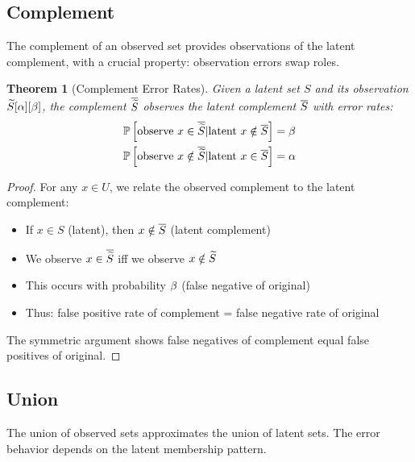 \documentclass[11pt,final,hidelinks]{article}
\newtheorem{theorem}{Theorem}[section]
\begin{document}
\subsection{Complement}

The complement of an observed set provides observations of the latent complement, with a crucial property: observation errors swap roles.

\begin{theorem}[Complement Error Rates]
Given a latent set $S$ and its observation $\widetilde{S}[\alpha][\beta]$, the complement $\overline{\widetilde{S}}$ observes the latent complement $\overline{S}$ with error rates:
\begin{align}
\mathbb{P}\left[\text{observe } x \in \overline{\widetilde{S}} | \text{latent } x \notin \overline{S}\right] &= \beta \\
\mathbb{P}\left[\text{observe } x \notin \overline{\widetilde{S}} | \text{latent } x \in \overline{S}\right] &= \alpha
\end{align}
\end{theorem}

\begin{proof}
For any $x \in U$, we relate the observed complement to the latent complement:
\begin{itemize}
    \item If $x \in S$ (latent), then $x \notin \overline{S}$ (latent complement)
    \item We observe $x \in \overline{\widetilde{S}}$ iff we observe $x \notin \widetilde{S}$
    \item This occurs with probability $\beta$ (false negative of original)
    \item Thus: false positive rate of complement = false negative rate of original
\end{itemize}
The symmetric argument shows false negatives of complement equal false positives of original.
\end{proof}

\subsection{Union}

The union of observed sets approximates the union of latent sets. The error behavior depends on the latent membership pattern.
\end{document}
